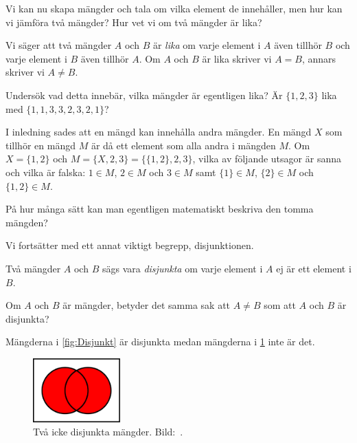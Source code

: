 Vi kan nu skapa mängder och tala om vilka element de innehåller, men hur kan vi
jämföra två mängder?
Hur vet vi om två mängder är lika?
\begin{definition}\label{def:Mangdlikhet}
  Vi säger att två mängder \(A\) och \(B\) är \emph{lika} om varje element i
  \(A\) även tillhör \(B\) och varje element i \(B\) även tillhör \(A\).
  Om \(A\) och \(B\) är lika skriver vi \(A=B\), annars skriver vi \(A\neq
  B\).
\end{definition}
\begin{exercise}\label{XrcLikhetMangd}
  Undersök vad detta innebär, vilka mängder är egentligen lika?
  Är \(\{1,2,3\}\) lika med \(\{1,1,3,3,2,3,2,1\}\)?
\end{exercise}
\begin{exercise}
  I inledning sades att en mängd kan innehålla andra mängder.
  En mängd \(X\) som tillhör en mängd \(M\) är då ett element som alla andra i
  mängden \(M\).
  Om \(X=\{1,2\}\) och \(M=\{X, 2, 3\}=\{\{1,2\},2,3\}\), vilka av följande
  utsagor är sanna och vilka är falska: 
  \(1\in M\), \(2\in M\) och \(3\in M\) samt \(\{1\}\in M\),
  \(\{2\}\in M\) och \(\{1,2\}\in M\).
\end{exercise}
\begin{exercise}\label{XrcBeskrivaTommaMangden}
  På hur många sätt kan man egentligen matematiskt beskriva den tomma
  mängden?
\end{exercise}

Vi fortsätter med ett annat viktigt begrepp, disjunktionen.
\begin{definition}\label{def:Disjunkt}
  Två mängder \(A\) och \(B\) sägs vara \emph{disjunkta} om varje element i
  \(A\) ej är ett element i \(B\).
\end{definition}
\begin{exercise}
  Om \(A\) och \(B\) är mängder, betyder det samma sak att \(A\neq B\) som
  att \(A\) och \(B\) är disjunkta?
\end{exercise}
Mängderna i \cref{fig:Disjunkt} är disjunkta medan mängderna 
i \cref{fig:IckeDisjunkt} inte är det.
\begin{figure}
  \includegraphics[width=0.3\textwidth]{figs/union.pdf}
  \caption{%
    Två icke disjunkta mängder.
    Bild:~\cite{Wikipedia2013Set}.
  }\label{fig:IckeDisjunkt}
\end{figure}



